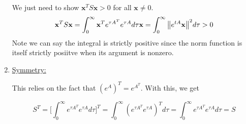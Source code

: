 \begin{solution}
\begin{enumerate}
        We just need to show $\textbf{x}^TS\textbf{x} > 0$ for all $\textbf{x} \neq 0$.
        \[
        \textbf{x}^TS\textbf{x} = \int_0^\infty \textbf{x}^T e^{\tau A^T}e^{\tau A} d\tau\textbf{x} =  \int_0^\infty \norm{e^{tA}\textbf{x}}^2 d\tau > 0
        \]
        Note we can say the integral is strictly positive since the norm function is itself strictly posiitve when its argument is nonzero.
        \item \underline{Symmetry:}

        This relies on the fact that $(e^{A})^T = e^{A^T}$. With this, we get

        \[
        S^T = \Big[ \int_0^\infty e^{\tau A^T}e^{\tau A} d\tau\Big]^T = \int_0^\infty (e^{\tau A^T}e^{\tau A})^T d\tau = \int_0^\infty e^{\tau A^T}e^{\tau A} d\tau = S
        \]
    \end{enumerate}
\end{solution}


